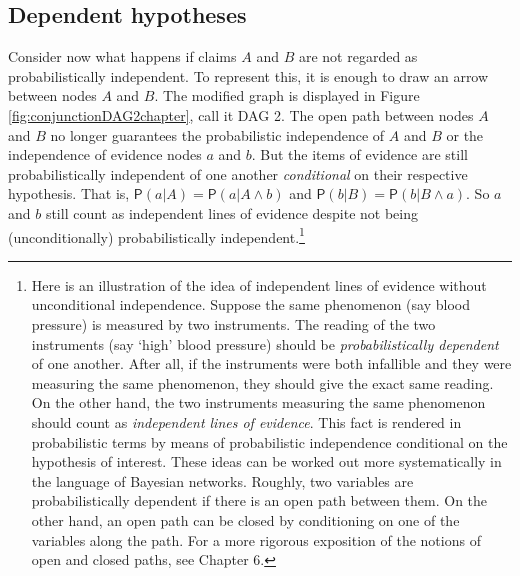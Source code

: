 \documentclass[
  10pt,
  dvipsnames,enabledeprecatedfontcommands]{scrartcl}
\newcommand{\pr}[1]{\ensuremath{\mathsf{P}(#1)}}
\begin{document}
\hypertarget{dependent-hypotheses}{%
\subsection{Dependent hypotheses}\label{dependent-hypotheses}}

Consider now what happens if claims \(A\) and \(B\) are not regarded as
probabilistically independent. To represent this, it is enough to draw
an arrow between nodes \(A\) and \(B\). The modified graph is displayed
in Figure \ref{fig:conjunctionDAG2chapter}, call it \textsf{DAG 2}. The
open path between nodes \(A\) and \(B\) no longer guarantees the
probabilistic independence of \(A\) and \(B\) or the independence of
evidence nodes \(a\) and \(b\). But the items of evidence are still
probabilistically independent of one another \textit{conditional} on
their respective hypothesis. That is,
\(\pr{a \vert A}=\pr{a \vert A \wedge b}\) and
\(\pr{b \vert B}=\pr{b \vert B \wedge a}\). So \(a\) and \(b\) still
count as independent lines of evidence despite not being
(unconditionally) probabilistically independent.\footnote{Here is an
  illustration of the idea of independent lines of evidence without
  unconditional independence. Suppose the same phenomenon (say blood
  pressure) is measured by two instruments. The reading of the two
  instruments (say `high' blood pressure) should be
  \textit{probabilistically dependent} of one another. After all, if the
  instruments were both infallible and they were measuring the same
  phenomenon, they should give the exact same reading. On the other
  hand, the two instruments measuring the same phenomenon should count
  as \textit{independent lines of evidence}. This fact is rendered in
  probabilistic terms by means of probabilistic independence conditional
  on the hypothesis of interest. These ideas can be worked out more
  systematically in the language of Bayesian networks. Roughly, two
  variables are probabilistically dependent if there is an open path
  between them. On the other hand, an open path can be closed by
  conditioning on one of the variables along the path. For a more
  rigorous exposition of the notions of open and closed paths, see
  Chapter 6.}
\end{document}
